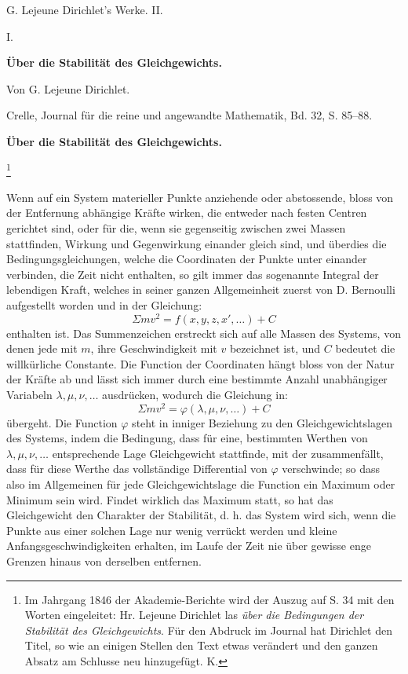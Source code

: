 \documentclass[11pt]{article}
\begin{document}
\begin{center}
{\Large G. Lejeune Dirichlet's Werke. II.}\par\vspace{1.5em}
{\Large I.}\par\vspace{0.5em}
{\LARGE \textbf{Über die Stabilität des Gleichgewichts.}}\par\vspace{1em}
{\large Von G. Lejeune Dirichlet.}\par\vspace{0.5em}
{\small Crelle, Journal für die reine und angewandte Mathematik, Bd. 32, S. 85--88.}
\end{center}

\begin{center}
\textbf{Über die Stabilität des Gleichgewichts.}
\end{center}

\footnote{Im Jahrgang 1846 der Akademie-Berichte wird der Auszug auf S. 34 mit den Worten eingeleitet: Hr. Lejeune Dirichlet las \emph{über die Bedingungen der Stabilität des Gleichgewichts}. Für den Abdruck im Journal hat Dirichlet den Titel, so wie an einigen Stellen den Text etwas verändert und den ganzen Absatz am Schlusse neu hinzugefügt. K.}

Wenn auf ein System materieller Punkte anziehende oder abstossende, bloss von der Entfernung abhängige Kräfte wirken, die entweder nach festen Centren gerichtet sind, oder für die, wenn sie gegenseitig zwischen zwei Massen stattfinden, Wirkung und Gegenwirkung einander gleich sind, und überdies die Bedingungsgleichungen, welche die Coordinaten der Punkte unter einander verbinden, die Zeit nicht enthalten, so gilt immer das sogenannte Integral der lebendigen Kraft, welches in seiner ganzen Allgemeinheit zuerst von D. Bernoulli aufgestellt worden und in der Gleichung:
\[
\Sigma m v^2 = f(x,y,z,x',\ldots)+C
\]
enthalten ist. Das Summenzeichen erstreckt sich auf alle Massen des Systems, von denen jede mit $m$, ihre Geschwindigkeit mit $v$ bezeichnet ist, und $C$ bedeutet die willkürliche Constante. Die Function der Coordinaten hängt bloss von der Natur der Kräfte ab und lässt sich immer durch eine bestimmte Anzahl unabhängiger Variabeln $\lambda,\mu,\nu,\ldots$ ausdrücken, wodurch die Gleichung in:
\[
\Sigma m v^2 = \varphi(\lambda,\mu,\nu,\ldots)+C
\]
übergeht. Die Function $\varphi$ steht in inniger Beziehung zu den Gleichgewichtslagen des Systems, indem die Bedingung, dass für eine, bestimmten Werthen von $\lambda,\mu,\nu,\ldots$ entsprechende Lage Gleichgewicht stattfinde, mit der zusammenfällt, dass für diese Werthe das vollständige Differential von $\varphi$ verschwinde; so dass also im Allgemeinen für jede Gleichgewichtslage die Function ein Maximum oder Minimum sein wird. Findet wirklich das Maximum statt, so hat das Gleichgewicht den Charakter der Stabilität, d. h. das System wird sich, wenn die Punkte aus einer solchen Lage nur wenig verrückt werden und kleine Anfangsgeschwindigkeiten erhalten, im Laufe der Zeit nie über gewisse enge Grenzen hinaus von derselben entfernen.
\end{document}
